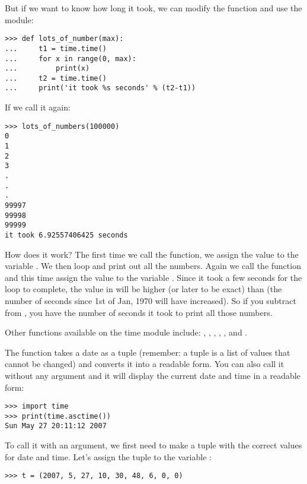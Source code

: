 \noindent
But if we want to know how long it took, we can modify the function and use the  module:

\begin{Verbatim}[frame=single]
>>> def lots_of_number(max):
...     t1 = time.time()
...     for x in range(0, max):
...         print(x)
...     t2 = time.time()
...     print('it took %s seconds' % (t2-t1))
\end{Verbatim}

\noindent
If we call it again:

\begin{Verbatim}[frame=single]
>>> lots_of_numbers(100000)
0
1
2
3
.
.
.
99997
99998
99999
it took 6.92557406425 seconds
\end{Verbatim}

\noindent
How does it work?  The first time we call the  function, we assign the value to the variable . We then loop and print out all the numbers. Again we call the  function and this time assign the value to the variable . Since it took a few seconds for the loop to complete, the value in  will be higher (or later to be exact) than  (the number of seconds since 1st of Jan, 1970 will have increased). So if you subtract  from , you have the number of seconds it took to print all those numbers.

Other functions available on the time module include: , , , , , and .

The function  takes a date as a tuple (remember: a tuple is a list of values that cannot be changed) and converts it into a readable form. You can also call it without any argument and it will display the current date and time in a readable form:

\begin{Verbatim}[frame=single]
>>> import time
>>> print(time.asctime())
Sun May 27 20:11:12 2007
\end{Verbatim}

\noindent
To call it with an argument, we first need to make a tuple with the correct values for date and time.  Let's assign the tuple to the variable :

\begin{Verbatim}[frame=single]
>>> t = (2007, 5, 27, 10, 30, 48, 6, 0, 0)
\end{Verbatim}

